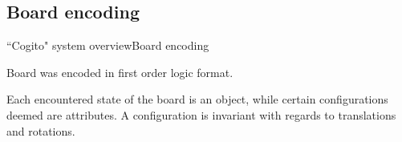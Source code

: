 \subsection{Board encoding}
\begin{frame}{``Cogito" system overview}{Board encoding}

Board was encoded in first order logic format.

Each encountered state of the board is an object, while certain configurations 
deemed are attributes. A configuration is invariant with regards to translations 
and rotations.

\end{frame}

